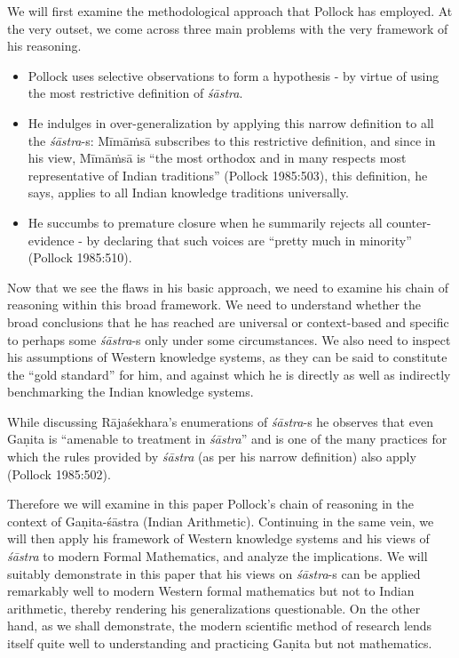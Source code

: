 We will first examine the methodological approach that Pollock has employed. At the very outset, we come across three main problems with the very framework of his reasoning.
\begin{itemize}
\item Pollock uses selective observations to form a hypothesis - by virtue of using the most restrictive definition of {\sl śāstra}.

\item He indulges in over-generalization by applying this narrow definition to all the {\sl śāstra}-s: Mīmāṁsā subscribes to this restrictive definition, and since in his view, Mīmāṁsā is ``the most orthodox and in many respects most representative of Indian traditions'' (Pollock 1985:503), this definition, he says, applies to all Indian knowledge traditions universally.

\item He succumbs to premature closure when he summarily rejects all counter-evidence - by declaring that such voices are ``pretty much in minority'' (Pollock 1985:510).
\end{itemize}

Now that we see the flaws in his basic approach, we need to examine his chain of reasoning within this broad framework. We need to understand whether the broad conclusions that he has reached are universal or context-based and specific to perhaps some {\sl śāstra}-s only under some circumstances.  We also need to inspect his assumptions of Western knowledge systems, as they can be said to constitute the ``gold standard'' for him, and against which he is directly as well as indirectly benchmarking the Indian knowledge systems.

While discussing Rājaśekhara’s enumerations of {\sl śāstra}-s he observes that even Gaṇita is ``amenable to treatment in {\sl śāstra}'' and is one of the many practices for which the rules provided by {\sl śāstra} (as per his narrow definition) also apply (Pollock 1985:502). 

Therefore we will examine in this paper Pollock’s chain of reasoning in the context of Gaṇita-śāstra (Indian Arithmetic). Continuing in the same vein, we will then apply his framework of Western knowledge systems and his views of {\sl śāstra} to modern Formal Mathematics, and analyze the implications. We will suitably demonstrate in this paper that his views on {\sl śāstra}-s can be applied remarkably well to modern Western formal mathematics but not to Indian arithmetic, thereby rendering his generalizations questionable. On the other hand, as we shall demonstrate, the modern scientific method of research lends itself quite well to understanding and practicing Gaṇita but not mathematics.

